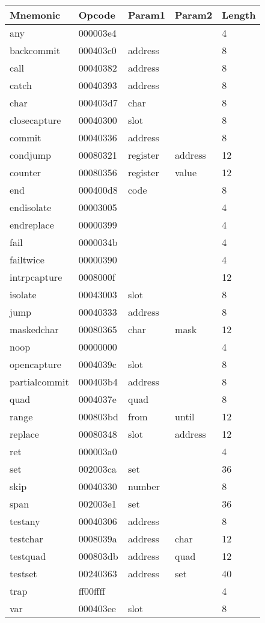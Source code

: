 
\begin{center}
\caption{Naigama Bytecode Instructions}
\label{tab:naig_bytecode}
\begin{longtable}{lllll}
\textbf{Mnemonic} & \textbf{Opcode} & \textbf{Param1} & \textbf{Param2} & \textbf{Length} \\
\endhead
any & 000003e4 &  &   & 4 \\
backcommit & 000403c0 & address &   & 8 \\
call & 00040382 & address &   & 8 \\
catch & 00040393 & address &   & 8 \\
char & 000403d7 & char &   & 8 \\
closecapture & 00040300 & slot &   & 8 \\
commit & 00040336 & address &   & 8 \\
condjump & 00080321 & register & address  & 12 \\
counter & 00080356 & register & value  & 12 \\
end & 000400d8 & code &   & 8 \\
endisolate & 00003005 &  &   & 4 \\
endreplace & 00000399 &  &   & 4 \\
fail & 0000034b &  &   & 4 \\
failtwice & 00000390 &  &   & 4 \\
intrpcapture & 0008000f &  &   & 12 \\
isolate & 00043003 & slot &   & 8 \\
jump & 00040333 & address &   & 8 \\
maskedchar & 00080365 & char & mask  & 12 \\
noop & 00000000 &  &   & 4 \\
opencapture & 0004039c & slot &   & 8 \\
partialcommit & 000403b4 & address &   & 8 \\
quad & 0004037e & quad &   & 8 \\
range & 000803bd & from & until  & 12 \\
replace & 00080348 & slot & address  & 12 \\
ret & 000003a0 &  &   & 4 \\
set & 002003ca & set &   & 36 \\
skip & 00040330 & number &   & 8 \\
span & 002003e1 & set &   & 36 \\
testany & 00040306 & address &   & 8 \\
testchar & 0008039a & address & char  & 12 \\
testquad & 000803db & address & quad  & 12 \\
testset & 00240363 & address & set  & 40 \\
trap & ff00ffff &  &   & 4 \\
var & 000403ee & slot &   & 8 \\
\end{longtable}
\end{center}
